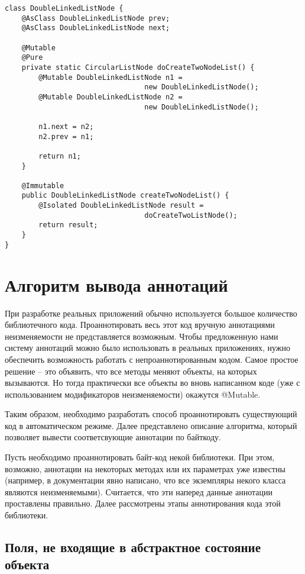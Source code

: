 \begin{lstlisting}[caption=DoubleLinkedListNode.java, label=code:circular_list_node_isolated]
class DoubleLinkedListNode {
    @AsClass DoubleLinkedListNode prev;
    @AsClass DoubleLinkedListNode next;
    
    @Mutable
    @Pure
    private static CircularListNode doCreateTwoNodeList() {
    	@Mutable DoubleLinkedListNode n1 = 
                                 new DoubleLinkedListNode();
        @Mutable DoubleLinkedListNode n2 = 
                                 new DoubleLinkedListNode();
    	
        n1.next = n2;
        n2.prev = n1;
    
        return n1;  
    }
    
    @Immutable
    public DoubleLinkedListNode createTwoNodeList() {
        @Isolated DoubleLinkedListNode result = 
                                 doCreateTwoListNode();
        return result;
    }
}
\end{lstlisting} 

\section{Алгоритм вывода аннотаций}

При разработке реальных приложений обычно используется большое количество библиотечного кода. Проаннотировать весь этот код вручную аннотациями неизменяемости не представляется возможным. Чтобы предложенную нами систему аннотаций можно было использовать в реальных приложениях, нужно обеспечить возможность работать с непроаннотированным кодом. Самое простое решение -- это объявить, что все методы меняют объекты, на которых вызываются. Но тогда практически все объекты во вновь написанном коде (уже с использованием модификаторов неизменяемости) окажутся @Mutable. 

Таким образом, необходимо разработать способ проаннотировать существующий код в автоматическом режиме. Далее представлено описание алгоритма, который позволяет вывести соответсвующие аннотации по байткоду. 

Пусть необходимо проаннотировать байт-код некой библиотеки. При этом, возможно, аннотации на некоторых методах или их параметрах уже известны (например, в документации явно написано, что все экземпляры некого класса являются неизменяемыми). Считается, что эти наперед данные аннотации проставлены правильно. Далее рассмотрены этапы аннотирования кода этой библиотеки.

\subsection{Поля, не входящие в абстрактное состояние объекта}

